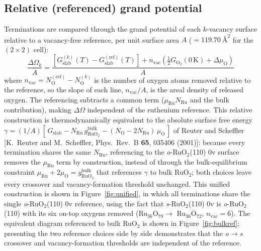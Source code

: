 \subsection*{Relative (referenced) grand potential}
Terminations are compared through the grand potential of each $k$-vacancy surface
relative to a vacancy-free reference, per unit surface area $A$
($=119.70~\text{\AA}^{2}$ for the $(2\times2)$ cell):
\begin{equation}
  \frac{\Delta\Omega_k}{A} =
  \frac{\left[G_{\mathrm{slab}}^{(k)}(T)
  - G_{\mathrm{slab}}^{(\mathrm{ref})}(T)\right]
  + n_{\mathrm{vac}}\left(\tfrac{1}{2}G_{\mathrm{O_2}}(0\,\mathrm{K})
  + \Delta\mu_{\mathrm O}\right)}{A}
  \label{eq:dOmega}
\end{equation}
where $n_{\mathrm{vac}} = N_{\mathrm O}^{(\mathrm{ref})} - N_{\mathrm O}^{(k)}$ is
the number of oxygen atoms removed relative to the reference, so the slope of each
line, $n_{\mathrm{vac}}/A$, is the areal density of released oxygen. The
referencing subtracts a common term ($\mu_{\mathrm{Ru}}N_{\mathrm{Ru}}$ and the
bulk contribution), making $\Delta\Omega$ independent of the ruthenium reference.
This relative construction is thermodynamically equivalent to the absolute surface
free energy $\gamma = (1/A)[\,G_{\mathrm{slab}} - N_{\mathrm{Ru}}\,g^{\mathrm{bulk}}_{\mathrm{RuO_2}}
- (N_{\mathrm O}-2N_{\mathrm{Ru}})\,\mu_{\mathrm O}\,]$ of Reuter and Scheffler
[K.~Reuter and M.~Scheffler, Phys.\ Rev.\ B \textbf{65}, 035406 (2001)]: because
every termination shares the same $N_{\mathrm{Ru}}$, referencing to the
\textit{o}-RuO$_2$(110) 0v surface removes the $\mu_{\mathrm{Ru}}$ term by
construction, instead of through the bulk-equilibrium constraint
$\mu_{\mathrm{Ru}}+2\mu_{\mathrm O}=g^{\mathrm{bulk}}_{\mathrm{RuO_2}}$ that references
$\gamma$ to bulk RuO$_2$; both choices leave every crossover and vacancy-formation
threshold unchanged.
This unified construction is shown in Figure~\ref{fig:unified}, in which all
terminations share the single \textit{o}-RuO$_2$(110) 0v reference, using the fact
that \textit{s}-RuO$_2$(110) 0v is \textit{o}-RuO$_2$(110) with its six on-top
oxygens removed (Ru$_{36}$O$_{78} \rightarrow$ Ru$_{36}$O$_{72}$,
$n_{\mathrm{vac}}=6$). The equivalent diagram referenced to bulk RuO$_2$ is shown
in Figure~\ref{fig:bulkref}; presenting the two reference choices side by side
demonstrates that the \textit{o}$\rightarrow$\textit{s} crossover and
vacancy-formation thresholds are independent of the reference.

